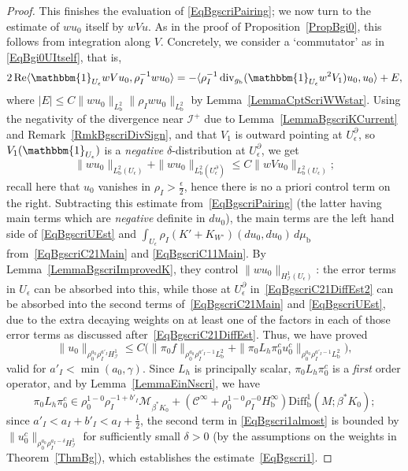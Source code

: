 \documentclass[reqno,11pt,letterpaper]{amsart}
\numberwithin{equation}{section}
\numberwithin{figure}{section}
\theoremstyle{definition}
\theoremstyle{remark}
\newcommand{\mc}{\mathcal}
\newcommand{\cC}{\mc C}
\newcommand{\cM}{\mc M}
\newcommand{\ms}{\mathscr}
\newcommand{\scri}{\ms I}
\newcommand{\one}{\mathbbm{1}}
\renewcommand{\Re}{\operatorname{Re}}
\newcommand{\dv}{\operatorname{div}}
\newcommand{\eps}{\epsilon}
\newcommand{\la}{\langle}
\newcommand{\pa}{\partial}
\newcommand{\ra}{\rangle}
\newcommand{\bop}{{\mathrm{b}}}
\newcommand{\Diff}{\mathrm{Diff}}
\newcommand{\Diffb}{\Diff_\bop}
\newcommand{\half}{\tfrac{1}{2}}
\newcommand{\CI}{\cC^\infty}
\newcommand{\Hb}{H_{\bop}}
\newcommand{\Hscri}{H_{\scri}}
\begin{document}
\begin{proof}
  This finishes the evaluation of \eqref{EqBgscriPairing}; we now turn to the estimate of $w u_0$ itself by $w V u$. As in the proof of Proposition~\ref{PropBgi0}, this follows from integration along $V$. Concretely, we consider a `commutator' as in \eqref{EqBgi0UItself}, that is,
  \begin{equation}
  \label{EqBgscriCommUItself}
    2\Re\la \one_{U_\eps}w V u_0, \rho_I^{-1}w u_0\ra = -\la \rho_I^{-1}\dv_{g_\bop}(\one_{U_\eps}w^2 V_1)u_0, u_0\ra + E,
  \end{equation}
  where $|E|\leq C\|w u_0\|_{L^2_\bop}\|\rho_I w u_0\|_{L^2_\bop}$ by Lemma~\ref{LemmaCptScriWWstar}. Using the negativity of the divergence near $\scri^+$ due to Lemma~\ref{LemmaBgscriKCurrent} and Remark~\ref{RmkBgscriDivSign}, and that $V_1$ is outward pointing at $U_\eps^\pa$, so $V_1(\one_{U_\eps})$ is a \emph{negative} $\delta$-distribution at $U_\eps^\pa$, we get
  \begin{equation}
  \label{EqBgscriUEst}
    \|w u_0\|_{L^2_\bop(U_\eps)} + \|w u_0\|_{L^2_\bop(U_\eps^\pa)} \leq C\|w V u_0\|_{L^2_\bop(U_\eps)};
  \end{equation}
  recall here that $u_0$ vanishes in $\rho_I>\tfrac{\eps}{2}$, hence there is no a priori control term on the right. Subtracting this estimate from~\eqref{EqBgscriPairing} (the latter having main terms which are \emph{negative} definite in $d u_0$), the main terms are the left hand side of \eqref{EqBgscriUEst} and $\int_{U_\eps} \rho_I(K'+K_{W^\circ})(d u_0,d u_0)\,d\mu_\bop$ from~\eqref{EqBgscriC21Main} and \eqref{EqBgscriC11Main}. By Lemma~\ref{LemmaBgscriImprovedK}, they control $\| w u_0 \|_{\Hscri^1(U_\eps)}$: the error terms in $U_\eps$ can be absorbed into this, while those at $U_\eps^\pa$ in~\eqref{EqBgscriC21DiffEst2} can be absorbed into the second terms of~\eqref{EqBgscriC21Main} and \eqref{EqBgscriUEst}, due to the extra decaying weights on at least one of the factors in each of those error terms as discussed after~\eqref{EqBgscriC21DiffEst}. Thus, we have proved
  \begin{equation}
  \label{EqBgscri1almost}
    \| u_0 \|_{\rho_0^{a_0}\rho_I^{a'_I}\Hscri^1} \leq C\bigl(\|\pi_0 f\|_{\rho_0^{a_0}\rho_I^{a'_I-1}L^2_\bop} + \| \pi_0 L_h\pi_0^c u_0^c \|_{\rho_0^{a_0}\rho_I^{a'_I-1}L^2_\bop}\bigr),
  \end{equation}
  valid for $a'_I<\min(a_0,\gamma)$. Since $L_h$ is principally scalar, $\pi_0 L_h\pi_0^c$ is a \emph{first} order operator, and by Lemma~\ref{LemmaEinNscri}, we have
  \begin{equation}
  \label{EqBgscriPi0LPi0c}
    \pi_0 L_h\pi_0^c \in \rho_0^{1-0}\rho_I^{-1+b'_I}\cM_{\beta^*K_0} + (\CI+\rho_0^{1-0}\rho_I^{-0}\Hb^\infty)\Diffb^1(M;\beta^*K_0);
  \end{equation}
  since $a'_I<a_I+b'_I<a_I+\half$, the second term in \eqref{EqBgscri1almost} is bounded by $\|u_0^c\|_{\rho_0^{a_0}\rho_I^{a_I-\delta}\Hscri^1}$ for sufficiently small $\delta>0$ (by the assumptions on the weights in Theorem~\ref{ThmBg}), which establishes the estimate~\eqref{EqBgscri1}.


\end{proof}
\end{document}
